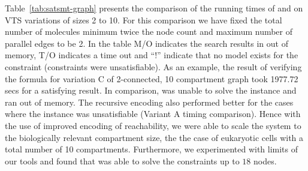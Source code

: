 

%
Table~\ref{tab:satsmt-graph} presents the comparison of the running times of {\smttool} and {\sattool} on VTS variations of sizes 2 to 10.
%
For this comparison we have fixed the total number of molecules minimum twice the node count 
%
and maximum number of parallel
edges to be 2.
%
%
In the table M/O indicates the search results in out of memory, T/O indicates a time out and ``!'' indicate that no model exists for the constraint  (constraints were unsatisfiable).
%
%
As an example, the result of verifying the formula for variation C of 2-connected, 10 compartment graph took 1977.72 secs for a satisfying result.
%
In comparison, {\sattool} was unable to solve the instance and ran out of memory.
%
% 
The recursive encoding also performed better for the cases where the instance was unsatisfiable (Variant A timing comparison).
%
Hence with the use of improved encoding of reachability, we were able to scale the system to the biologically relevant compartment size, the
the case of eukaryotic cells with a total number of 10 compartments.
%
Furthermore, we experimented with limits of our tools and found that {\smttool} was able to solve the constraints up to $18$ nodes.



